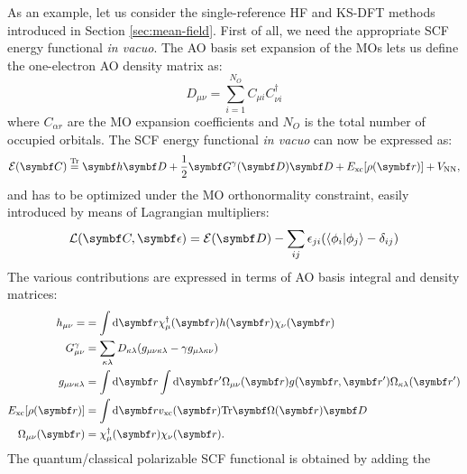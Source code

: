 As an example, let us consider the single-reference \acrshort{HF} and
\acrshort{KS}-\acrshort{DFT} methods introduced in Section
\ref{sec:mean-field}.
First of all, we need the appropriate \acrshort{SCF} energy functional
\emph{in vacuo}.
The \acrshort{AO} basis set expansion of the \glspl{MO} lets us define
the one-electron \acrshort{AO} density matrix as:
\begin{equation}
  D_{\mu\nu} = \sum_{i=1}^{N_O}C_{\mu i}C^\dagger_{\nu i}
\end{equation}
where $C_{\alpha r}$ are the \acrshort*{MO} expansion coefficients and
$N_O$ is the total number of occupied orbitals.
The \acrshort*{SCF} energy functional \emph{in vacuo} can now be
expressed as:
\begin{equation}\label{eq:scf-functional}
  \mathcal{E}(\mat{C}) \eqtr \mat{h}\mat{D} + \frac{1}{2}
  \mat{G}^\gamma(\mat{D})\mat{D} + E_\mathrm{xc}[\rho(\vect{r})] +
  V_\mathrm{NN},
\end{equation}
and has to be optimized under the \acrshort*{MO} orthonormality
constraint, easily introduced by means of Lagrangian multipliers:
\begin{equation}\label{eq:scf-lagrangian}
  \mathcal{L}(\mat{C}, \mat{\epsilon}) = \mathcal{E}(\mat{D}) -
  \sum_{ij}\epsilon_{ji}(\braket{\phi_i|\phi_j} - \delta_{ij})
\end{equation}
The various contributions are expressed in terms of \acrshort*{AO} basis
integral and density matrices:
\begin{subequations}
  \begin{align}
  h_{\mu\nu} = &= \int \diff\vect{r}
  \chi_\mu^\dagger(\vect{r})h(\vect{r})\chi_\nu(\vect{r}) \label{eq:ao-one-el} \\
  G_{\mu\nu}^\gamma &=
  \sum_{\kappa\lambda}D_{\kappa\lambda}(g_{\mu\nu\kappa\lambda} -
  \gamma g_{\mu\lambda\kappa\nu}) \label{eq:two-el-matrix} \\
  g_{\mu\nu\kappa\lambda} &=
  \int\diff\vect{r}\int\diff\vect{r}^\prime
  \Omega_{\mu\nu}(\vect{r}) g(\vect{r},\vect{r}^\prime)
  \Omega_{\kappa\lambda}(\vect{r}^\prime) \label{eq:ao-two-el} \\
  E_\mathrm{xc}[\rho(\vect{r})] &=
  \int\diff\vect{r}
  v_\mathrm{xc}(\vect{r})\Tr\mat{\Omega}(\vect{r})\mat{D} \label{eq:ao-xc} \\
  \Omega_{\mu\nu}(\vect{r}) &= \chi_\mu^\dagger(\vect{r})\chi_\nu(\vect{r}).
  \label{eq:ao-overlap}
  \end{align}
\end{subequations}
The quantum/classical polarizable \acrshort*{SCF} functional is obtained by adding the

